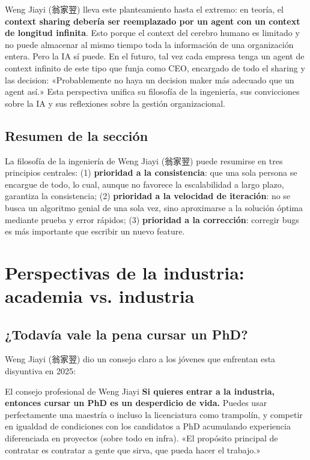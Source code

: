 \documentclass[a4paper]{article}
\begin{document}
Weng Jiayi (翁家翌) lleva este planteamiento hasta el extremo: en teoría, el \textbf{context sharing debería ser reemplazado por un agent con un context de longitud infinita}. Esto porque el context del cerebro humano es limitado y no puede almacenar al mismo tiempo toda la información de una organización entera. Pero la IA sí puede. En el futuro, tal vez cada empresa tenga un agent de context infinito de este tipo que funja como CEO, encargado de todo el sharing y las decision: «Probablemente no haya un decision maker más adecuado que un agent así.» Esta perspectiva unifica su filosofía de la ingeniería, sus convicciones sobre la IA y sus reflexiones sobre la gestión organizacional.

\subsection{Resumen de la sección}

La filosofía de la ingeniería de Weng Jiayi (翁家翌) puede resumirse en tres principios centrales: (1) \textbf{prioridad a la consistencia}: que una sola persona se encargue de todo, lo cual, aunque no favorece la escalabilidad a largo plazo, garantiza la consistencia; (2) \textbf{prioridad a la velocidad de iteración}: no se busca un algoritmo genial de una sola vez, sino aproximarse a la solución óptima mediante prueba y error rápidos; (3) \textbf{prioridad a la corrección}: corregir bugs es más importante que escribir un nuevo feature.


\section{Perspectivas de la industria: academia vs. industria}

\subsection{¿Todavía vale la pena cursar un PhD?}

Weng Jiayi (翁家翌) dio un consejo claro a los jóvenes que enfrentan esta disyuntiva en 2025:

\begin{importantbox}{El consejo profesional de Weng Jiayi}
\textbf{Si quieres entrar a la industria, entonces cursar un PhD es un desperdicio de vida.} Puedes usar perfectamente una maestría o incluso la licenciatura como trampolín, y competir en igualdad de condiciones con los candidatos a PhD acumulando experiencia diferenciada en proyectos (sobre todo en infra). «El propósito principal de contratar es contratar a gente que sirva, que pueda hacer el trabajo.»
\end{importantbox}
\end{document}
